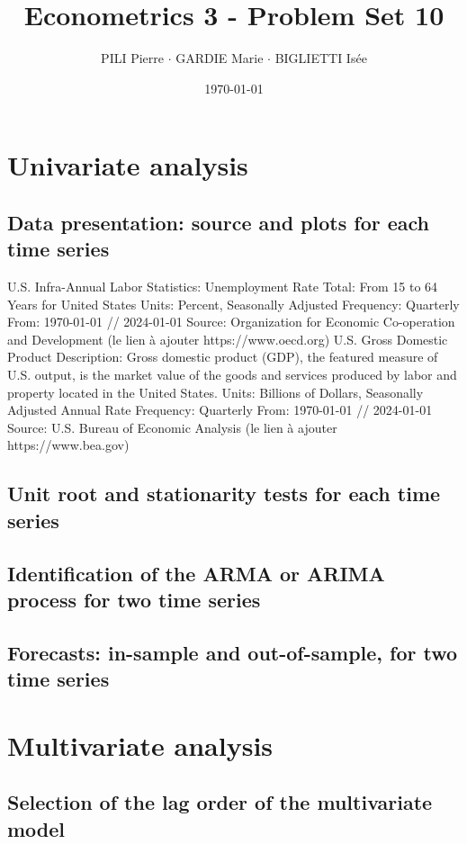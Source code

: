 \documentclass[12pt]{article}
\title{Econometrics 3 - Problem Set 10}
\author{PILI Pierre $\cdot$ GARDIE Marie $\cdot$ BIGLIETTI Isée}
\date{\today}
\begin{document}
\maketitle

\section{Univariate analysis}
\subsection{Data presentation: source and plots for each time series}
U.S. Infra-Annual Labor Statistics: Unemployment Rate Total: From 15 to 64 Years for United States
Units: Percent, Seasonally Adjusted 
Frequency: Quarterly
From: 1970-01-01 // 2024-01-01
Source: Organization for Economic Co-operation and Development (le lien à ajouter https://www.oecd.org)
U.S. Gross Domestic Product
Description: Gross domestic product (GDP), the featured measure of U.S. output, is the market value of the goods and services 
produced by labor and property located in the United States.
Units: Billions of Dollars, Seasonally Adjusted Annual Rate
Frequency: Quarterly
From: 1970-01-01 // 2024-01-01
Source: U.S. Bureau of Economic Analysis (le lien à ajouter https://www.bea.gov)

\subsection{Unit root and stationarity tests for each time series}

\subsection{Identification of the ARMA or ARIMA process for two time series}

\subsection{Forecasts: in-sample and out-of-sample, for two time series}



\section{Multivariate analysis}
\subsection{Selection of the lag order of the multivariate model}
\end{document}
